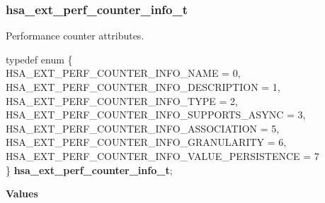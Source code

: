 \documentclass[final,oneside]{book}
\newcommand{\reftyp}[1]{#1}
\newcommand{\refenu}[1]{\reftyp{#1}}
\newenvironment{mylongtable}{\rowcolors{0}{lightgray}{lightgray}\longtable} {
\endlongtable}
\begin{document}
\subsubsection{hsa_\-ext_\-perf_\-counter_\-info_\-t}
\vspace{-2.5mm}Performance counter attributes.\begin{mylongtable}{@{}p{\textwidth}}
\rule{0pt}{3ex}typedef enum \{\\\hspace{1.7em}\hypertarget{group__ext-performance-counters_1gga71d623b4fdc55109b71c12f1ccd04e5aa23b54f071f4cadfc9abe8541cfc0a489}{\refenu{HSA_\-EXT_\-PERF_\-COUNTER_\-INFO_\-NAME}} = 0,\\
\hspace{1.7em}\hypertarget{group__ext-performance-counters_1gga71d623b4fdc55109b71c12f1ccd04e5aa61b1bc85a904ec18937d8312c62a7c09}{\refenu{HSA_\-EXT_\-PERF_\-COUNTER_\-INFO_\-DESCRIPTION}} = 1,\\
\hspace{1.7em}\hypertarget{group__ext-performance-counters_1gga71d623b4fdc55109b71c12f1ccd04e5aa1f3ad960b4004159936c3c52e3096417}{\refenu{HSA_\-EXT_\-PERF_\-COUNTER_\-INFO_\-TYPE}} = 2,\\
\hspace{1.7em}\hypertarget{group__ext-performance-counters_1gga71d623b4fdc55109b71c12f1ccd04e5aa031efa81a482640d6d3047754261ec26}{\refenu{HSA_\-EXT_\-PERF_\-COUNTER_\-INFO_\-SUPPORTS_\-ASYNC}} = 3,\\
\hspace{1.7em}\hypertarget{group__ext-performance-counters_1gga71d623b4fdc55109b71c12f1ccd04e5aa375a96998686d66146eca21b440996c2}{\refenu{HSA_\-EXT_\-PERF_\-COUNTER_\-INFO_\-ASSOCIATION}} = 5,\\
\hspace{1.7em}\hypertarget{group__ext-performance-counters_1gga71d623b4fdc55109b71c12f1ccd04e5aaffbff21a36675fe541c0d2fea61daf7c}{\refenu{HSA_\-EXT_\-PERF_\-COUNTER_\-INFO_\-GRANULARITY}} = 6,\\
\hspace{1.7em}\hypertarget{group__ext-performance-counters_1gga71d623b4fdc55109b71c12f1ccd04e5aa9ab18c7c0722fad485e6a3b9f786fdaa}{\refenu{HSA_\-EXT_\-PERF_\-COUNTER_\-INFO_\-VALUE_\-PERSISTENCE}} = 7\\
\} \hypertarget{group__ext-performance-counters_1ga71d623b4fdc55109b71c12f1ccd04e5a}{\textbf{hsa_\-ext_\-perf_\-counter_\-info_\-t}};\rule[-2ex]{0pt}{0pt}\end{mylongtable}\noindent\textbf{Values}\\[-7mm]
\end{document}
